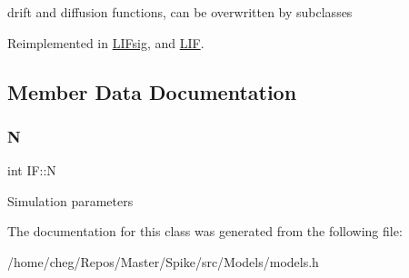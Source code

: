 drift and diffusion functions, can be overwritten by subclasses 

Reimplemented in \hyperlink{classLIFsig_a169dcb5d3704157102bbc725445cf0a5}{L\+I\+Fsig}, and \hyperlink{classLIF_aea677a0cf3f943edb7a957479e18d6dc}{L\+IF}.



\subsection{Member Data Documentation}
\mbox{\label{classIF_aa81bddacf949214f2265214d7174f4c2}} 
\subsubsection{\texorpdfstring{N}{N}}
{\footnotesize\ttfamily int I\+F\+::N}

Simulation parameters 

The documentation for this class was generated from the following file\+:\begin{DoxyCompactItemize}
\item 
/home/cheg/\+Repos/\+Master/\+Spike/src/\+Models/models.\+h\end{DoxyCompactItemize}
